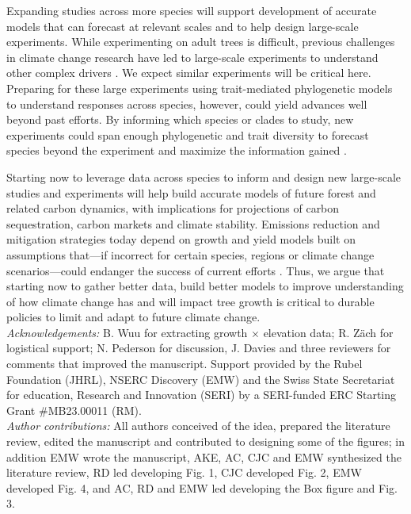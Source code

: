 \documentclass[11pt]{article}
\begin{document}
Expanding studies across more species will support development of accurate models that can forecast at relevant scales and to help design large-scale experiments. While experimenting on adult trees is difficult, previous challenges in climate change research have led to large-scale experiments to understand other complex drivers \citep[e.g. SPRUCE, DroughtNet, Pfynwald,][]{norby2011ecological,hanson2017attaining,smith2016drought}. We expect similar experiments will be critical here. Preparing for these large experiments using trait-mediated phylogenetic models to understand responses across species, however, could yield advances well beyond past efforts. By informing which species or clades to study, new experiments could span enough phylogenetic and trait diversity to forecast species beyond the experiment and maximize the information gained \citep{cadotte2017phylogenies}. 

Starting now to leverage data across species to inform and design new large-scale studies and experiments will help build accurate models of future forest and related carbon dynamics, with implications for projections of carbon sequestration, carbon markets and climate stability. Emissions reduction and mitigation strategies today depend on growth and yield models built on assumptions that---if incorrect for certain species, regions or climate change scenarios---could endanger the success of current efforts \citep{ellis2024principles}. Thus, we argue that starting now to gather better data, build better models to improve understanding of how climate change has and will impact tree growth is critical to durable policies to limit and adapt to future climate change.\\


\emph{Acknowledgements:} B. Wuu for extracting growth $\times$ elevation data; R. Z{\"a}ch for logistical support; N. Pederson for discussion, J. Davies and three reviewers for comments that improved the manuscript. Support provided by the Rubel Foundation (JHRL), NSERC Discovery (EMW) and the Swiss State Secretariat for education, Research and Innovation (SERI) by a SERI-funded ERC Starting Grant #MB23.00011 (RM). \\

\emph{Author contributions:}  All authors conceived of the idea, prepared the literature review, edited the manuscript and contributed to designing some of the figures; in addition EMW wrote the manuscript, AKE, AC, CJC  and EMW synthesized the literature review, RD led developing Fig. 1, CJC developed Fig. 2, EMW developed Fig. 4, and AC, RD and EMW led developing the Box figure and Fig. 3. \\
\end{document}

